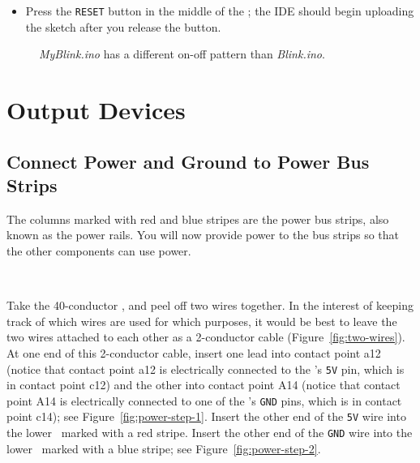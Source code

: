 \begin{itemize}
\item Press the \texttt{RESET} button in the middle of the \nano; the IDE
    should begin uploading the sketch after you release the button.
\end{itemize}

\begin{figure}
    \centering
    \caption{\textit{MyBlink.ino} has a different on-off
        pattern than \textit{Blink.ino}.\label{fig:myblink}}
\end{figure}


\section{Output Devices}

\subsection{Connect Power and Ground to Power Bus Strips}

The columns marked with red and blue stripes are the power bus strips, also
known as the power rails. You will now provide power to the bus strips so that
the other components can use power.

\disconnect\

Take the 40-conductor \rainbow, and peel off two wires together. In the
interest of keeping track of which wires are used for which purposes, it would
be best to leave the two wires attached to each other as a 2-conductor cable
(Figure~\ref{fig:two-wires}). At one end of this 2-conductor cable, insert one
lead into contact point a12 (notice that contact point a12 is electrically
connected to the \nano's \texttt{5V} pin, which is in contact point c12) and
the other into contact point A14 (notice that contact point A14 is electrically
connected to one of the \nano's \texttt{GND} pins, which is in contact point
c14); see Figure~\ref{fig:power-step-1}. Insert the other end of the
\texttt{5V} wire into the lower \power\ marked with a red stripe. Insert the
other end of the \texttt{GND} wire into the lower \ground\ marked with a blue
stripe; see Figure~\ref{fig:power-step-2}.

